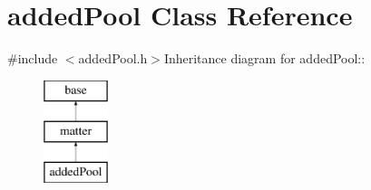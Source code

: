 \hypertarget{classadded_pool}{
\section{addedPool Class Reference}
\label{classadded_pool}
}


{\ttfamily \#include $<$addedPool.h$>$}Inheritance diagram for addedPool::\begin{figure}[H]
\begin{center}
\leavevmode
\includegraphics[height=3cm]{classadded_pool}
\end{center}
\end{figure}
